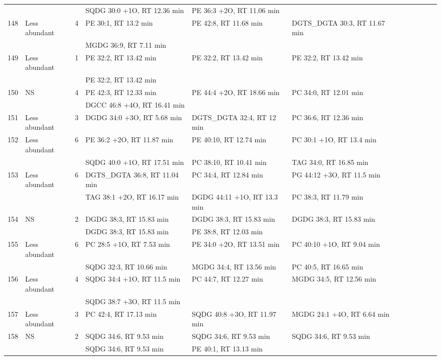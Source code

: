 \begin{landscape}
\begin{footnotesize}
\begin{singlespace}
\begin{flushleft}
\begin{longtable}{ Lp{.03\linewidth} Lp{.12\linewidth} Lp{.03\linewidth} Lp{.24\linewidth} Lp{.24\linewidth} Lp{.24\linewidth} }
 &  &  & SQDG 30:0 +1O, RT 12.36 min & PE 36:3 +2O, RT 11.06 min &  \\
148 & Less abundant & 4 & PE 30:1, RT 13.2 min & PE 42:8, RT 11.68 min & DGTS\_DGTA 30:3, RT 11.67 min \\
 &  &  & MGDG 36:9, RT 7.11 min &  &  \\
149 & Less abundant & 1 & PE 32:2, RT 13.42 min & PE 32:2, RT 13.42 min & PE 32:2, RT 13.42 min \\
 &  &  & PE 32:2, RT 13.42 min &  &  \\
150 & NS & 4 & PE 42:3, RT 12.33 min & PE 44:4 +2O, RT 18.66 min & PC 34:0, RT 12.01 min \\
 &  &  & DGCC 46:8 +4O, RT 16.41 min &  &  \\
151 & Less abundant & 3 & DGDG 34:0 +3O, RT 5.68 min & DGTS\_DGTA 32:4, RT 12 min & PC 36:6, RT 12.36 min \\
152 & Less abundant & 6 & PE 36:2 +2O, RT 11.87 min & PE 40:10, RT 12.74 min & PC 30:1 +1O, RT 13.4 min \\
 &  &  & SQDG 40:0 +1O, RT 17.51 min & PC 38:10, RT 10.41 min & TAG 34:0, RT 16.85 min \\
153 & Less abundant & 6 & DGTS\_DGTA 36:8, RT 11.04 min & PC 34:4, RT 12.84 min & PG 44:12 +3O, RT 11.5 min \\
 &  &  & TAG 38:1 +2O, RT 16.17 min & DGDG 44:11 +1O, RT 13.3 min & PC 38:3, RT 11.79 min \\
154 & NS & 2 & DGDG 38:3, RT 15.83 min & DGDG 38:3, RT 15.83 min & DGDG 38:3, RT 15.83 min \\
 &  &  & DGDG 38:3, RT 15.83 min & PE 38:8, RT 12.03 min &  \\
155 & Less abundant & 6 & PC 28:5 +1O, RT 7.53 min & PE 34:0 +2O, RT 13.51 min & PC 40:10 +1O, RT 9.04 min \\
 &  &  & SQDG 32:3, RT 10.66 min & MGDG 34:4, RT 13.56 min & PC 40:5, RT 16.65 min \\
156 & Less abundant & 4 & SQDG 34:4 +1O, RT 11.5 min & PC 44:7, RT 12.27 min & MGDG 34:5, RT 12.56 min \\
 &  &  & SQDG 38:7 +3O, RT 11.5 min &  &  \\
157 & Less abundant & 3 & PC 42:4, RT 17.13 min & SQDG 40:8 +3O, RT 11.97 min & MGDG 24:1 +4O, RT 6.64 min \\
158 & NS & 2 & SQDG 34:6, RT 9.53 min & SQDG 34:6, RT 9.53 min & SQDG 34:6, RT 9.53 min \\
 &  &  & SQDG 34:6, RT 9.53 min & PE 40:1, RT 13.13 min &  \\

\end{longtable}
\end{flushleft}
\end{singlespace}
\end{footnotesize}
\end{landscape}

